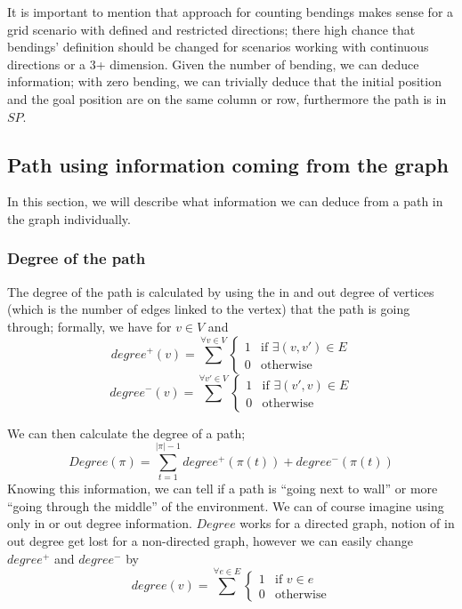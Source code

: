 It is important to mention that approach for counting bendings makes sense for a grid scenario with defined and restricted directions; there high chance that bendings' definition should be changed for scenarios working with continuous directions or a 3+ dimension. 
Given the number of bending, we can deduce information; with zero bending, we can trivially deduce that the initial position and the goal position are on the same column or row, furthermore the path is in \(SP\).




\subsection{Path using information coming from the graph}
In this section, we will describe what information we can deduce from a path in the graph individually. 
\subsubsection{Degree of the path}
The degree of the path is calculated by using the in and out degree of vertices (which is the number of edges linked to the vertex) that the path is going through; formally, we have for \(v\in V\) and \[
  degree^+(v) = \sum^{\forall v\in V}{ 
    \begin{cases}
    1 & \text{if } \exists (v,v') \in E \\
    0 & \text{otherwise}  
    \end{cases}}
\] 
\[
  degree^-(v) = \sum^{\forall v'\in V}{  
    \begin{cases}
    1 & \text{if } \exists (v',v) \in E \\
    0 & \text{otherwise}  
    \end{cases}}
\] 



We can then calculate the degree of a path; \[
  Degree(\pi) = \sum_{t=1}^{|\pi|-1} degree^+(\pi(t)) + degree^-(\pi(t))
  \] Knowing this information, we can tell if a path is ``going next to wall'' or more ``going through the middle'' of the environment. We can of course imagine using only in or out degree information. \(Degree\) works for a directed graph, notion of in out degree get lost for a non-directed graph, however we can easily change \(degree^+\) and \(degree^-\) by  \[
    degree(v) = \sum^{\forall e\in E}{ 
      \begin{cases}
      1 & \text{if } v\in e \\
      0 & \text{otherwise}  
      \end{cases}}
  \]

